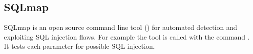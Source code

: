 \subsection{SQLmap}
SQLmap is an open source command line tool () for automated detection and exploiting SQL injection flaws. For example the tool is called with the command . It tests each parameter for possible SQL injection.